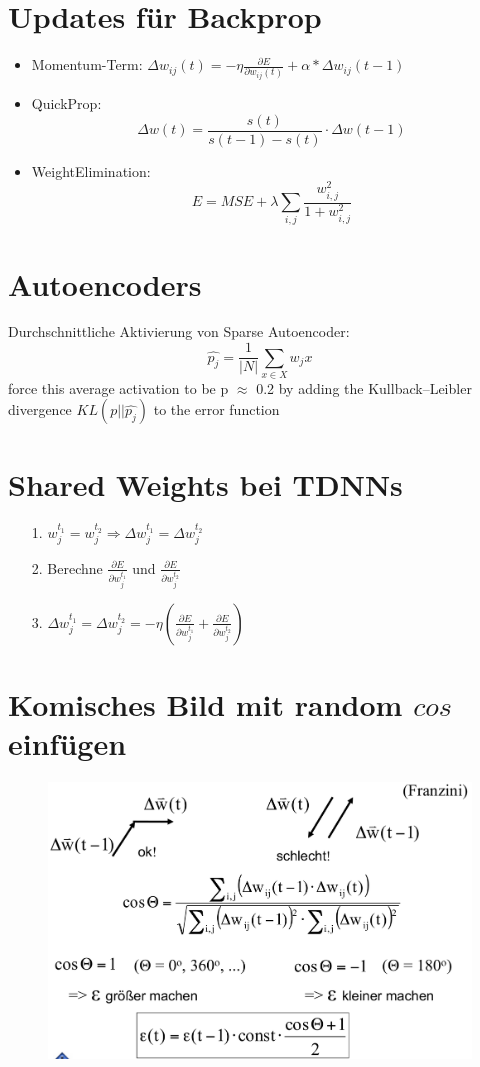 \documentclass[paper=a4, fontsize=11pt]{scrartcl} %
\begin{document}
\section{Updates für Backprop}

\begin{itemize}
\item Momentum-Term: $\Delta w_{ij}(t) = - \eta \frac{\partial E}{\partial w_{ij}(t)} + \alpha * \Delta w_{ij}(t-1)$
\item QuickProp: \[
\Delta w(t) = \frac{s(t)}{s(t - 1) - s(t)} \cdot \Delta w(t-1)
\]
\item WeightElimination: \[
E = MSE + \lambda \sum_{i,j} \frac{w_{i,j}^2}{1 + w_{i,j}^2}
\]
\end{itemize}

\section{Autoencoders}
Durchschnittliche Aktivierung von Sparse Autoencoder: 
\[
\widehat{p_j} = \frac{1}{|N|} \sum_{x \in X} w_j x
\]
force this average activation to be p $\approx$ 0.2 by adding the Kullback–Leibler divergence $KL(p || \widehat{p_j})$ to the error function
\section{Shared Weights bei TDNNs}
\begin{itemize}
	\item[1.]$w_j^{t_1} = w_j^{t_2} \Rightarrow \Delta w_j^{t_1} = \Delta w_j^{t_2}$
	\item[2.]Berechne $\frac{\partial E}{\partial w_j^{t_1}}$ und $\frac{\partial E}{\partial w_j^{t_2}}$
	\item[3.] $\Delta w_j^{t_1} = \Delta w_j^{t_2} = -\eta \left(\frac{\partial E}{\partial w_j^{t_1}} + \frac{\partial E}{\partial w_j^{t_2}}\right)$
\end{itemize}


\section{Komisches Bild mit random $cos$ einfügen}

\begin{figure}[h]
\includegraphics[scale=0.3]{img/dynamic-learning-rate}
\end{figure}
\end{document}
